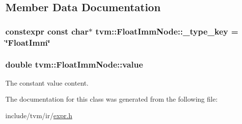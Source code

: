 \subsection{Member Data Documentation}
\subsubsection[{\texorpdfstring{\+\_\+type\+\_\+key}{_type_key}}]{\setlength{\rightskip}{0pt plus 5cm}constexpr const char$\ast$ tvm\+::\+Float\+Imm\+Node\+::\+\_\+type\+\_\+key = \char`\"{}Float\+Imm\char`\"{}\hspace{0.3cm}{\ttfamily [static]}}\hypertarget{classtvm_1_1FloatImmNode_ab43f63c181c5e97e1c7da83deacc73e2}{}\label{classtvm_1_1FloatImmNode_ab43f63c181c5e97e1c7da83deacc73e2}
\subsubsection[{\texorpdfstring{value}{value}}]{\setlength{\rightskip}{0pt plus 5cm}double tvm\+::\+Float\+Imm\+Node\+::value}\hypertarget{classtvm_1_1FloatImmNode_a88ce961273d224831b187d8e9f149e08}{}\label{classtvm_1_1FloatImmNode_a88ce961273d224831b187d8e9f149e08}


The constant value content. 



The documentation for this class was generated from the following file\+:\begin{DoxyCompactItemize}
\item 
include/tvm/ir/\hyperlink{ir_2expr_8h}{expr.\+h}\end{DoxyCompactItemize}
